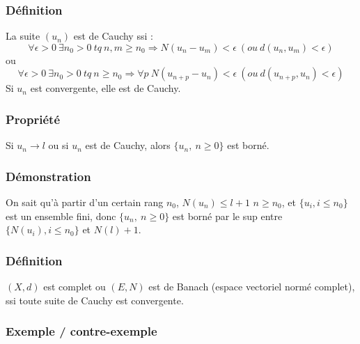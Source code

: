 \documentclass[a4paper, oneside]{report}
\begin{document}
\subsubsection{Définition}
La suite $(u_n)$ est de Cauchy ssi :
$$\forall \epsilon >0~ \exists n_0>0~tq~n,m\geq n_0 \Rightarrow N(u_n-u_m)<\epsilon~(ou~d(u_n,u_m)<\epsilon)$$
ou 
$$\forall \epsilon >0~ \exists n_0>0~tq~n\geq n_0 \Rightarrow \forall p~N(u_{n+p}-u_n)<\epsilon~(ou~d(u_{n+p},u_n)<\epsilon)$$
Si $u_n$ est convergente, elle est de Cauchy.

\subsubsection{Propriété}

Si $u_n \rightarrow l$ ou si $u_n$ est de Cauchy, alors $\{u_n,~n\geq 0 \}$ est borné.

\subsubsection{Démonstration}
On sait qu'à partir d'un certain rang $n_0$, $N(u_n) \leq l+1$ $n\geq n_0$, et $\{u_i, i\leq n_0 \}$ est un ensemble fini, donc $\{u_n,~n\geq 0 \}$ est borné par le sup entre $\{N(u_i), i\leq n_0 \}$ et $N(l)+1$.

\subsubsection{Définition}

$(X,d)$ est complet ou $(E,N)$ est de Banach (espace vectoriel normé complet), ssi toute suite de Cauchy est convergente.

\subsubsection{Exemple / contre-exemple}
\end{document}
